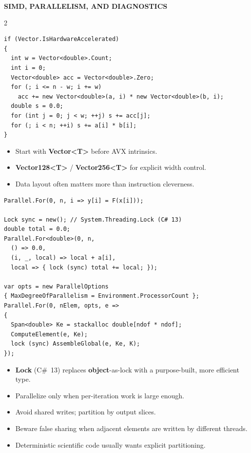 \documentclass[9pt,a4paper]{extarticle}
\newenvironment{card}[3][acBlue]{%
  \begin{tcolorbox}[
    enhanced, colback=#2, colframe=bdCard,
    coltitle=black, colbacktitle=#2!70!bgHdr,
    fonttitle=\bfseries\fontsize{6.0pt}{7.2pt}\selectfont\MakeUppercase,
    title={#3},
    left=3pt, right=2pt, top=1.2pt, bottom=1.6pt,
    toptitle=1.0pt, bottomtitle=1.0pt,
    boxrule=0.4pt,
    borderline west={3pt}{0pt}{#1},
    arc=2pt, before skip=0pt, after skip=1.6mm,
    breakable,
  ]}{\end{tcolorbox}}
\newcommand{\sectionbanner}[1]{%
  \vspace{0.5mm}%
  {\setlength{\fboxsep}{1.5pt}%
   \colorbox{secBg}{\color{white}\bfseries\fontsize{6.5pt}{7.7pt}\selectfont
   \MakeUppercase{\hspace{0.5mm}#1\hspace{0.5mm}}}%
  }\vspace{1.3mm}\par\nobreak}
\newcommand{\code}[1]{{\ttfamily\bfseries #1}}
\begin{document}
\sectionbanner{SIMD, Parallelism, and Diagnostics}
\begin{multicols}{2}

\begin{card}[acOrange]{bgOrange}{SIMD and Intrinsics}
\begin{lstlisting}[style=cs]
if (Vector.IsHardwareAccelerated)
{
  int w = Vector<double>.Count;
  int i = 0;
  Vector<double> acc = Vector<double>.Zero;
  for (; i <= n - w; i += w)
    acc += new Vector<double>(a, i) * new Vector<double>(b, i);
  double s = 0.0;
  for (int j = 0; j < w; ++j) s += acc[j];
  for (; i < n; ++i) s += a[i] * b[i];
}
\end{lstlisting}
\begin{itemize}
\item Start with \code{Vector<T>} before AVX intrinsics.
\item \code{Vector128<T>} / \code{Vector256<T>} for explicit width control.
\item Data layout often matters more than instruction cleverness.
\end{itemize}
\end{card}

\begin{card}[acNavy]{bgNavy}{Parallel Loops}
\begin{lstlisting}[style=cs]
Parallel.For(0, n, i => y[i] = F(x[i]));

Lock sync = new(); // System.Threading.Lock (C# 13)
double total = 0.0;
Parallel.For<double>(0, n,
  () => 0.0,
  (i, _, local) => local + a[i],
  local => { lock (sync) total += local; });

var opts = new ParallelOptions
{ MaxDegreeOfParallelism = Environment.ProcessorCount };
Parallel.For(0, nElem, opts, e =>
{
  Span<double> Ke = stackalloc double[ndof * ndof];
  ComputeElement(e, Ke);
  lock (sync) AssembleGlobal(e, Ke, K);
});
\end{lstlisting}
\begin{itemize}
\item \code{Lock} (C\#~13) replaces \code{object}-as-lock with a purpose-built, more efficient type.
\item Parallelize only when per-iteration work is large enough.
\item Avoid shared writes; partition by output slices.
\item Beware false sharing when adjacent elements are written by different threads.
\item Deterministic scientific code usually wants explicit partitioning.
\end{itemize}
\end{card}


\end{multicols}
\end{document}
